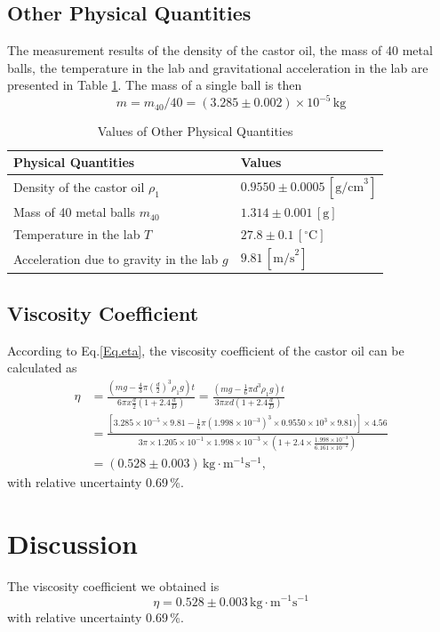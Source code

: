 \documentclass[a4paper]{article}
\begin{document}
	\subsection{Other Physical Quantities}
The measurement results of the density of the castor oil, the mass of 40 metal balls, the temperature in the lab and gravitational acceleration in the lab are presented in Table \ref{Tab.data}. The mass of a single ball is then
$$m = m_{40}/40 = (3.285 \pm 0.002) \times 10^{-5}\,\text{kg}$$
\begin{table}[!h]
\centering
\begin{tabular}{ll}
\toprule
Physical Quantities & Values\\
\midrule
Density of the castor oil $\rho_1$ & $0.9550 \pm 0.0005 \,[ \text{g/cm}^3]$\\
Mass of 40 metal balls $m_{40}$& $1.314 \pm 0.001 \,[\text{g}]$\\
Temperature in the lab $T$ &$27.8\pm 0.1 \,[^\circ \text{C}]$\\
Acceleration due to gravity in the lab $g$ & $9.81 \,[\text{m/s}^2]$\\
\bottomrule
\end{tabular}
\caption{Values of Other Physical Quantities}\label{Tab.data}
\end{table}

	\subsection{Viscosity Coefficient}
According to Eq.\eqref{Eq.eta}, the viscosity coefficient of the castor oil can be calculated as
\begin{align*}
\eta &= \frac{(mg-\frac{4}{3}\pi (\frac{d}{2})^3\rho_1g)t}{6\pi x \frac{d}{2}(1+2.4\frac{d}{D})}=\frac{(mg-\frac{1}{6}\pi d^3\rho_1g)t}{3\pi xd(1+2.4\frac{d}{D})}\\
&=\frac{\left[3.285\times10^{-5}\times9.81-\frac{1}{6}\pi (1.998\times10^{-3})^3\times0.9550\times10^{3}\times9.81)\right]\times4.56}{3\pi\times 1.205 \times 10^{-1} \times 1.998 \times 10^{-3} \times (1+2.4\times\frac{1.998\times10^{-3}}{6.161\times10^{-2}})}\\
&= (0.528 \pm 0.003) \, \text{kg}\cdot\text{m}^{-1}\text{s}^{-1},
\end{align*}
with relative uncertainty 0.69\,\%.



		\section{Discussion}
The viscosity coefficient we obtained is
$$\eta = 0.528 \pm 0.003 \, \text{kg}\cdot\text{m}^{-1}\text{s}^{-1} $$
with relative uncertainty 0.69\,\%.
\end{document}
